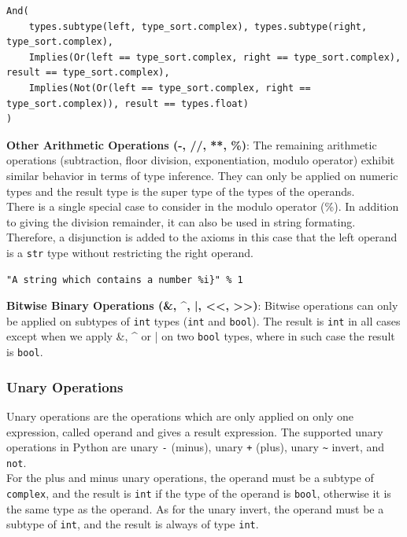 \begin{lstlisting}
And(
	types.subtype(left, type_sort.complex), types.subtype(right, type_sort.complex),
	Implies(Or(left == type_sort.complex, right == type_sort.complex), result == type_sort.complex),
	Implies(Not(Or(left == type_sort.complex, right == type_sort.complex)), result == types.float)
)
\end{lstlisting}

\textbf{Other Arithmetic Operations (-, //, **, \%)}:
The remaining arithmetic operations (subtraction, floor division, exponentiation, modulo operator) exhibit similar behavior in terms of type inference. They can only be applied on numeric types and the result type is the super type of the types of the operands. \\

There is a single special case to consider in the modulo operator (\%). In addition to giving the division remainder, it can also be used in string formating. Therefore, a disjunction is added to the axioms in this case that the left operand is a \lstinline|str| type without restricting the right operand.

\begin{lstlisting}
"A string which contains a number %i}" % 1
\end{lstlisting}

\textbf{Bitwise Binary Operations (\&, \textrm{\^}, |, <<, >>)}:
Bitwise operations can only be applied on subtypes of \lstinline|int| types (\lstinline|int| and \lstinline|bool|). The result is \lstinline|int| in all cases except when we apply \&, \textrm{\^} or | on two \lstinline|bool| types, where in such case the result is \lstinline|bool|.

\subsubsection{Unary Operations}
Unary operations are the operations which are only applied on only one expression, called operand and gives a result expression. The supported unary operations in Python are unary \lstinline|-| (minus), unary \lstinline|+| (plus), unary \lstinline|~| invert, and \lstinline|not|.\\

For the plus and minus unary operations, the operand must be a subtype of \lstinline|complex|, and the result is \lstinline|int| if the type of the operand is \lstinline|bool|, otherwise it is the same type as the operand. As for the unary invert, the operand must be a subtype of \lstinline|int|, and the result is always of type \lstinline|int|.

